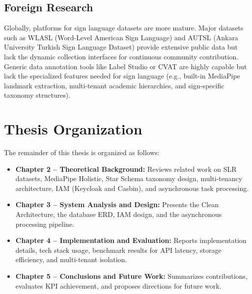\subsection{Foreign Research}
Globally, platforms for sign language datasets are more mature. Major datasets such as WLASL (Word-Level American Sign Language) and AUTSL (Ankara University Turkish Sign Language Dataset) provide extensive public data but lack the dynamic collection interfaces for continuous community contribution. Generic data annotation tools like Label Studio or CVAT are highly capable but lack the specialized features needed for sign language (e.g., built-in MediaPipe landmark extraction, multi-tenant academic hierarchies, and sign-specific taxonomy structures).

\section{Thesis Organization}

The remainder of this thesis is organized as follows:
\begin{itemize}
    \item \textbf{Chapter 2 -- Theoretical Background:} Reviews related work on SLR datasets, MediaPipe Holistic, Star Schema taxonomy design, multi-tenancy architecture, IAM (Keycloak and Casbin), and asynchronous task processing.
    \item \textbf{Chapter 3 -- System Analysis and Design:} Presents the Clean Architecture, the database ERD, IAM design, and the asynchronous processing pipeline.
    \item \textbf{Chapter 4 -- Implementation and Evaluation:} Reports implementation details, tech stack usage, benchmark results for API latency, storage efficiency, and multi-tenant isolation.
    \item \textbf{Chapter 5 -- Conclusions and Future Work:} Summarizes contributions, evaluates KPI achievement, and proposes directions for future work.
\end{itemize}
